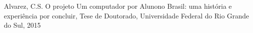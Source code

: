 \documentclass[
12pt,		%
openright,	%
twoside,  %
a4paper,			%
chapter=TITLE,		%
english,			%
french,				%
spanish,			%
brazil				%
]{USPSC-classe/USPSC}
\begin{document}
\begin{flushleft}
\begin{flushleft}
\begin{flushleft}
\begin{flushleft}
\begin{flushleft}
\begin{flushleft}
\begin{flushleft}
\begin{flushleft}
\begin{flushleft}
\begin{flushleft}
[ALVAREZ, 2015] Alvarez, C.S. O projeto \textquotedbl Um computador por Aluno\textquotedbl  no Brasil: uma hist\'oria e experi\^encia por concluir, Tese de Doutorado, Universidade Federal do Rio Grande do Sul, 2015
\end{flushleft}


\end{flushleft}


\end{flushleft}


\end{flushleft}


\end{flushleft}


\end{flushleft}


\end{flushleft}


\end{flushleft}


\end{flushleft}


\end{flushleft}
\end{document}
